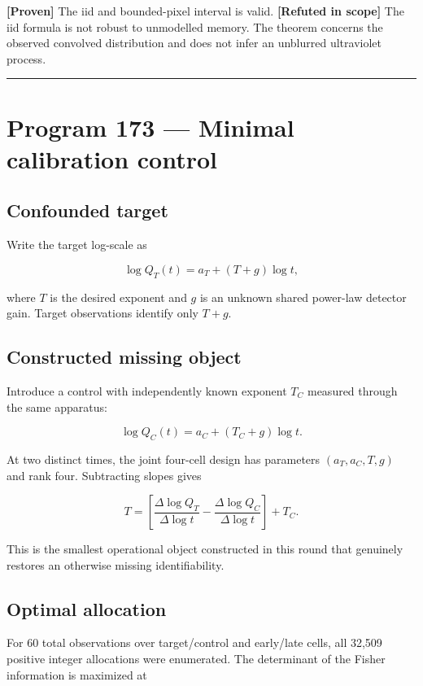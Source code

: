 \documentclass[11pt,a4paper,openany]{report}
\newcommand{\statusProven}{\textcolor{fingreen}{[Proven]}}
\newcommand{\statusRefuted}{\textcolor{finred}{[Refuted in scope]}}
\begin{document}
\textbf{\statusProven{}} The iid and bounded-pixel interval is valid. \textbf{\statusRefuted{}} The iid formula is not robust to unmodelled memory. The theorem concerns the observed convolved distribution and does not infer an unblurred ultraviolet process.

\par\medskip\hrule\medskip

\chapter{Program 173 --- Minimal calibration control}

\section{Confounded target}

Write the target log-scale as

\[
\log Q_T(t)=a_T+(T+g)\log t,
\]

where \(T\) is the desired exponent and \(g\) is an unknown shared power-law detector gain. Target observations identify only \(T+g\).

\section{Constructed missing object}

Introduce a control with independently known exponent \(T_C\) measured through the same apparatus:

\[
\log Q_C(t)=a_C+(T_C+g)\log t.
\]

At two distinct times, the joint four-cell design has parameters \((a_T,a_C,T,g)\) and rank four. Subtracting slopes gives

\[
T=
\left[
\frac{\Delta\log Q_T}{\Delta\log t}
-
\frac{\Delta\log Q_C}{\Delta\log t}
\right]+T_C.
\]

This is the smallest operational object constructed in this round that genuinely restores an otherwise missing identifiability.

\section{Optimal allocation}

For 60 total observations over target/\allowbreak{}control and early/\allowbreak{}late cells, all 32,509 positive integer allocations were enumerated. The determinant of the Fisher information is maximized at
\end{document}
